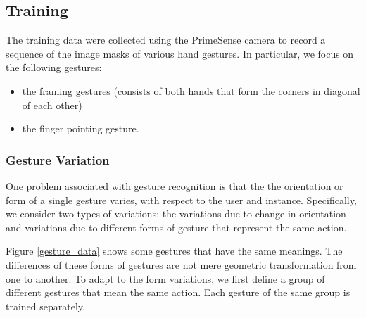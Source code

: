 \documentclass[conference]{IEEEtran}
\begin{document}
\subsection{Training}
The training data were collected using the PrimeSense camera to record a sequence of the image masks of various hand gestures. In particular, we focus on the following gestures:
\begin{itemize}
    \item the framing gestures (consists of both hands that form the corners in diagonal of each other)
    \item the finger pointing gesture.
\end{itemize}

\subsubsection{Gesture Variation}
One problem associated with gesture recognition is that the the orientation or form of a single gesture varies, with respect to the user and instance. 
Specifically, we consider two types of variations: the variations due to change in orientation \cite{ren2011robust, uebersax2011real, li2009real} and variations due to different forms of gesture that represent the same action. 

Figure \ref{gesture_data} shows some gestures that have the same meanings. The differences of these forms of gestures are not mere geometric transformation from one to another. To adapt to the form variations, we first define a group of different gestures that mean the same action. Each gesture of the same group is trained separately.
\end{document}
